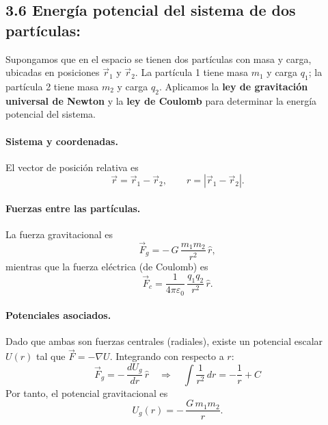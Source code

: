 \subsection*{3.6 \textcolor{Cinnabar}{\textbf{Energía potencial del sistema de dos partículas:}}}

Supongamos que en el espacio se tienen dos partículas con masa y carga, ubicadas en posiciones
\(\vec{r}_1\) y \(\vec{r}_2\). La partícula 1 tiene masa \(m_1\) y carga \(q_1\); 
la partícula 2 tiene masa \(m_2\) y carga \(q_2\).
Aplicamos la \textbf{ley de gravitación universal de Newton} y la \textbf{ley de Coulomb} 
para determinar la energía potencial del sistema.

\paragraph{Sistema y coordenadas.}
\begin{center}
\end{center}

El vector de posición relativa es
\[
\vec{r} = \vec{r}_1 - \vec{r}_2, 
\qquad 
r = |\vec{r}_1 - \vec{r}_2|.
\]

\paragraph{Fuerzas entre las partículas.}
La fuerza gravitacional es
\[
\vec{F}_g = -\,G\,\frac{m_1 m_2}{r^2}\,\hat{r},
\]
mientras que la fuerza eléctrica (de Coulomb) es
\[
\vec{F}_c = \frac{1}{4\pi\varepsilon_0}\,\frac{q_1 q_2}{r^2}\,\hat{r}.
\]

\paragraph{Potenciales asociados.}
Dado que ambas son fuerzas centrales (radiales), existe un potencial escalar \(U(r)\)
tal que \(\vec{F}=-\nabla U\). 
Integrando con respecto a \(r\):
\[
\vec{F}_g = -\,\frac{dU_g}{dr}\,\hat{r}
\quad\Rightarrow\quad
\int \frac{1}{r^2}\,dr = -\frac{1}{r} + C
\]
Por tanto, el potencial gravitacional es
\[
\boxed{U_g(r) = -\,\frac{G\,m_1 m_2}{r}}.
\]

